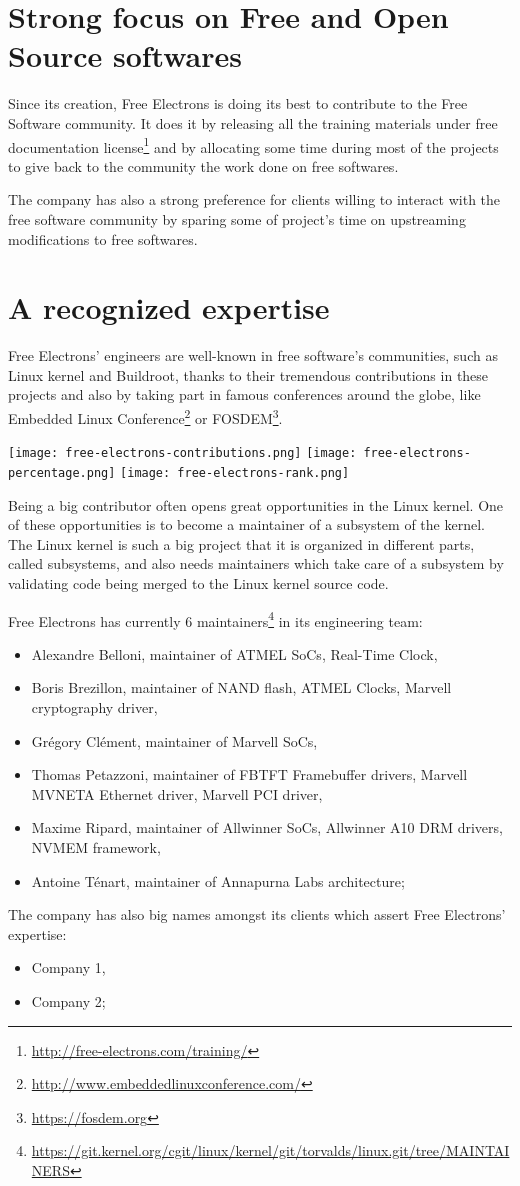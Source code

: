 \section{Strong focus on Free and Open Source softwares}
Since its creation, Free Electrons is doing its best to contribute to the Free Software community. It does it by releasing all the training materials under free documentation license\footnote{\url{http://free-electrons.com/training/}} and by allocating some time during most of the projects to give back to the community the work done on free softwares.

The company has also a strong preference for clients willing to interact with the free software community by sparing some of project's time on upstreaming modifications to free softwares.

\section{A recognized expertise}
Free Electrons' engineers are well-known in free software's communities, such as Linux kernel and Buildroot, thanks to their tremendous contributions in these projects and also by taking part in famous conferences around the globe, like Embedded Linux Conference\footnote{\url{http://www.embeddedlinuxconference.com/}} or FOSDEM\footnote{\url{https://fosdem.org}}.

\texttt{[image: free-electrons-contributions.png]}
\texttt{[image: free-electrons-percentage.png]}
\texttt{[image: free-electrons-rank.png]}

Being a big contributor often opens great opportunities in the Linux kernel. One of these opportunities is to become a maintainer of a subsystem of the kernel. The Linux kernel is such a big project that it is organized in different parts, called subsystems, and also needs maintainers which take care of a subsystem by validating code being merged to the Linux kernel source code.

Free Electrons has currently 6 maintainers\footnote{\url{https://git.kernel.org/cgit/linux/kernel/git/torvalds/linux.git/tree/MAINTAINERS}} in its engineering team:
\begin{itemize}
\item Alexandre Belloni, maintainer of ATMEL SoCs, Real-Time Clock,
\item Boris Brezillon, maintainer of NAND flash, ATMEL Clocks, Marvell cryptography driver,
\item Grégory Clément, maintainer of Marvell SoCs,
\item Thomas Petazzoni, maintainer of FBTFT Framebuffer drivers, Marvell MVNETA Ethernet driver, Marvell PCI driver,
\item Maxime Ripard, maintainer of Allwinner SoCs, Allwinner A10 DRM drivers, NVMEM framework,
\item Antoine Ténart, maintainer of Annapurna Labs architecture;
\end{itemize}

The company has also big names amongst its clients which assert Free Electrons' expertise:
\begin{itemize}
\item Company 1,
\item Company 2;
\end{itemize}
